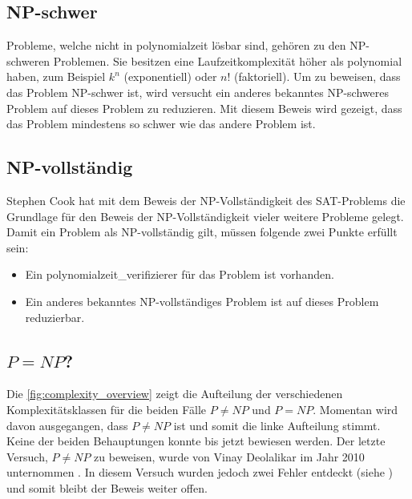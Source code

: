 \subsection{NP-schwer}\label{np_hard}
Probleme, welche nicht in \gls{polynomialzeit} lösbar sind, gehören zu den NP-schweren Problemen. Sie besitzen eine Laufzeitkomplexität höher als polynomial haben, zum Beispiel 
$k^n$ (exponentiell) oder $n!$ (faktoriell). Um zu beweisen, dass das Problem NP-schwer ist, wird versucht ein anderes bekanntes NP-schweres Problem auf dieses Problem zu reduzieren. Mit 
diesem Beweis wird gezeigt, dass das Problem mindestens so schwer wie das andere Problem ist.

\subsection{NP-vollständig}\label{np_complet}
Stephen Cook hat mit dem Beweis der NP-Vollständigkeit des SAT-Problems \cite{cook_complexity} die Grundlage für den Beweis der NP-Vollständigkeit vieler weitere Probleme 
gelegt. Damit ein Problem als NP-vollständig gilt, müssen folgende zwei Punkte erfüllt sein:
\begin{itemize}
	\item Ein \gls{polynomialzeit_verifizierer} für das Problem ist vorhanden.
	\item Ein anderes bekanntes NP-vollständiges Problem ist auf dieses Problem reduzierbar.
\end{itemize}

\subsection{$P = NP$?}
Die \autoref{fig:complexity_overview} zeigt die Aufteilung der verschiedenen Komplexitätsklassen für die beiden Fälle $P \neq NP$ und $P=NP$. Momentan wird davon ausgegangen, 
dass $P \neq NP$ ist und somit die linke Aufteilung stimmt. Keine der beiden Behauptungen konnte bis jetzt bewiesen werden. Der letzte Versuch, $P \neq NP$ zu beweisen, wurde von 
Vinay Deolalikar im Jahr 2010 unternommen \cite{p_neq_np_paper}. In diesem Versuch wurden jedoch zwei Fehler entdeckt (siehe \cite{p_neq_np_paper_blog}) und somit bleibt der 
Beweis weiter offen.

